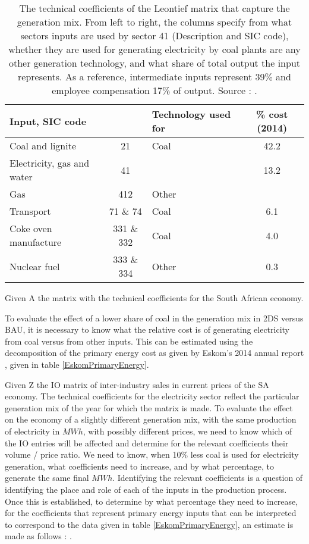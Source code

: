 \documentclass[12pt,english]{article}
\begin{document}
\begin{table}[ht]
	\centering
	\begin{tabular}{lclc}
		\toprule
		\multicolumn{2}{l}{Input, SIC code}	& Technology used for  &  \% cost (2014) \\ 
		\midrule
		Coal and lignite & 21 &  Coal &  42.2    \\
	 	Electricity, gas and water & 41 &  & 13.2     \\
		Gas &412 & Other &     \\
		Transport &71 \& 74 &  Coal  &   6.1   \\
		Coke oven manufacture & 331 \& 332 & Coal &  4.0 \\
		Nuclear fuel & 333 \& 334 & Other & 0.3   \\
		\bottomrule
	\end{tabular}
	\caption{\label{GenerationMixcoefficients}The technical coefficients of the Leontief matrix that capture the generation mix. From left to right, the columns specify from what sectors inputs are used by sector 41 (Description and SIC code), whether they are used for generating electricity by coal plants are any other generation technology, and what share of total output the input represents. As a reference, intermediate inputs represent 39\% and employee compensation 17\% of output. Source : \cite{IOT2014}.}
\end{table}

 

Given A the matrix with the technical coefficients for the South African economy. 

To evaluate the effect of a lower share of coal in the generation mix in 2DS versus BAU, it is necessary to know what the relative cost is of generating electricity from coal versus from other inputs. This can be estimated using the decomposition of the primary energy cost as given by Eskom's 2014 annual report \citep{Eskom2014AR}, given in table \ref{EskomPrimaryEnergy}. 

Given Z the IO matrix of inter-industry sales in current prices of the SA economy. The technical coefficients for the electricity sector reflect the particular generation mix of the year for which the matrix is made. To evaluate the effect on the economy of a slightly different generation mix, with the same production of electricity in $MWh$, with possibly different prices, we need to know which of the IO entries will be affected and determine for the relevant coefficients their volume / price ratio. We need to know, when 10\% less coal is used for electricity generation, what coefficients need to increase, and by what percentage, to generate the same final $MWh$. Identifying the relevant coefficients is a question of identifying the place and role of each of the inputs in the production process. Once this is established, to determine by what percentage they need to increase, for the coefficients that represent primary energy inputs that can be interpreted to correspond to the data given in table \ref{EskomPrimaryEnergy}, an estimate is made as follows : .
\end{document}

